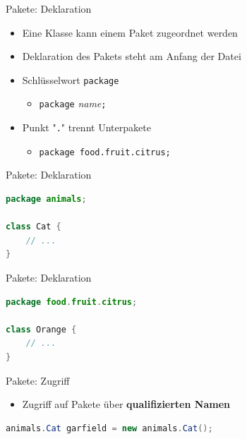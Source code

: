 \documentclass[18pt]{beamer}
\begin{document}
\begin{frame}{Pakete: Deklaration}
    \begin{itemize}
        \item Eine Klasse kann einem Paket zugeordnet werden
        \item Deklaration des Pakets steht am Anfang der Datei
        \item Schlüsselwort \texttt{package}
        \begin{itemize}
            \item \texttt{package} \textit{name}\texttt{;}
        \end{itemize}
        \item Punkt "\texttt{.}" trennt Unterpakete
        \begin{itemize}
            \item \texttt{package food.fruit.citrus;}
        \end{itemize}
    \end{itemize}
\end{frame}

\begin{frame}[fragile]{Pakete: Deklaration}
    \begin{exampleblock}{}
        \begin{lstlisting}[language=Java]
package animals;

class Cat {
    // ...
}
        \end{lstlisting}
    \end{exampleblock}
\end{frame}

\begin{frame}[fragile]{Pakete: Deklaration}
    \begin{exampleblock}{}
        \begin{lstlisting}[language=Java]
package food.fruit.citrus;

class Orange {
    // ...
}
        \end{lstlisting}
    \end{exampleblock}
\end{frame}

\begin{frame}[fragile]{Pakete: Zugriff}
    \begin{itemize}
        \item Zugriff auf Pakete über \textbf{qualifizierten Namen}
    \end{itemize}
    \begin{exampleblock}{}
        \begin{lstlisting}[language=Java]
animals.Cat garfield = new animals.Cat();
        \end{lstlisting}
    \end{exampleblock}
\end{frame}
\end{document}
